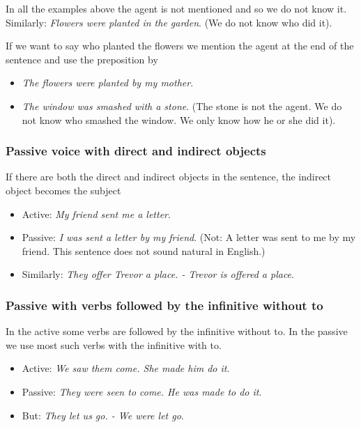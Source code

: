 In all the examples above the agent is not mentioned and so we do not know it.  Similarly: \textit{Flowers were planted in the garden}. (We do not know who did it).

If we want to say who planted the flowers we mention the agent at the end of the sentence and use the preposition by

\begin{itemize}

\item \textit{The flowers were planted by my mother}.
\item \textit{The window was smashed with a stone}. (The stone is not the agent. We do not know who smashed the window. We only know how he or she did it).
\end{itemize}

\subsubsection{Passive voice with direct and indirect objects}

If there are both the direct and indirect objects in the sentence, the indirect object becomes the subject

\begin{itemize}

\item Active: \textit{My friend sent me a letter}.
\item Passive: \textit{I was sent a letter by my friend}. (Not: A letter was sent to me by my friend. This sentence does not sound natural in English.) 
\item Similarly: \textit{They offer Trevor a place. - Trevor is offered a place}.
\end{itemize}

\subsubsection{Passive with verbs followed by the infinitive without to}

In the active some verbs are followed by the infinitive without to. In the passive we use most such verbs with the infinitive with to. 

\begin{itemize}

\item Active: \textit{We saw them come. She made him do it}.
\item Passive: \textit{They were seen to come. He was made to do it}.
\item But: \textit{They let us go. - We were let go}.
\end{itemize}

